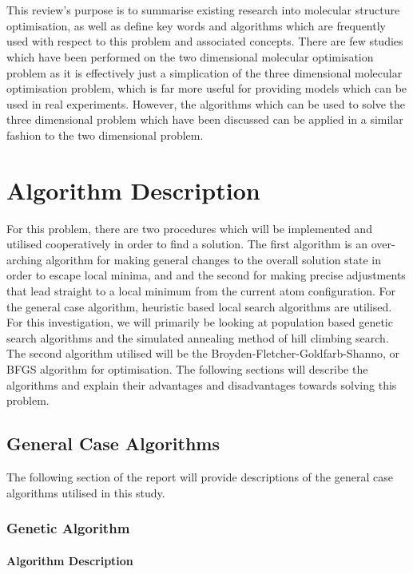 \documentclass[9pt]{article}
\begin{document}
\\
\\
This review's purpose is to summarise existing research into molecular structure optimisation, as well as define key words and algorithms which are frequently used with respect to this problem and associated concepts. There are few studies which have been performed on the two dimensional molecular optimisation problem as it is effectively just a simplication of the three dimensional molecular optimisation problem, which is far more useful for providing models which can be used in real experiments. However, the algorithms which can be used to solve the three dimensional problem which have been discussed can be applied in a similar fashion to the two dimensional problem.

\section{Algorithm Description}

For this problem, there are two procedures which will be implemented and utilised cooperatively in order to find a solution. The first algorithm is an over-arching algorithm for making general changes to the overall solution state in order to escape local minima, and and the second for making precise adjustments that lead straight to a local minimum  from the current atom configuration. For the general case algorithm, heuristic based local search algorithms are utilised. For this investigation, we will primarily be looking at population based genetic search algorithms and the simulated annealing method of hill climbing search. The second algorithm utilised will be the Broyden-Fletcher-Goldfarb-Shanno, or BFGS algorithm for optimisation. The following sections will describe the algorithms and explain their advantages and disadvantages towards solving this problem.

\subsection{General Case Algorithms}

The following section of the report will provide descriptions of the general case algorithms utilised in this study.

\subsubsection{Genetic Algorithm}

\paragraph{Algorithm Description}
\end{document}
